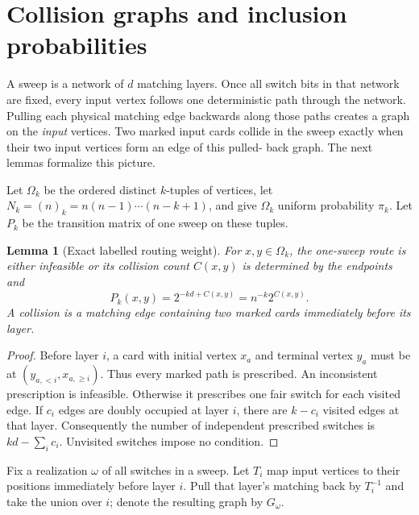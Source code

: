 \documentclass[11pt]{article}
\numberwithin{equation}{section}
\newtheorem{lemma}[theorem]{Lemma}
\theoremstyle{definition}\newtheorem{definition}[theorem]{Definition}
\theoremstyle{remark}\newtheorem{remark}[theorem]{Remark}
\begin{document}
\section{Collision graphs and inclusion probabilities}
\label{sec:graph}
A sweep is a network of $d$ matching layers.  Once all switch bits in that
network are fixed, every input vertex follows one deterministic path through
the network.  Pulling each physical matching edge backwards along those paths
creates a graph on the \emph{input} vertices.  Two marked input cards collide
in the sweep exactly when their two input vertices form an edge of this pulled-
back graph.  The next lemmas formalize this picture.

Let $\Omega_k$ be the ordered distinct $k$-tuples of vertices, let
$N_k=(n)_k=n(n-1)\cdots(n-k+1)$, and give $\Omega_k$ uniform probability
$\pi_k$. Let $P_k$ be the transition matrix of one sweep on these tuples.

\begin{lemma}[Exact labelled routing weight]\label{lem:routing}
For $x,y\in\Omega_k$, the one-sweep route is either infeasible or its
collision count $C(x,y)$ is determined by the endpoints and
\begin{equation}\label{eq:routing}
 P_k(x,y)=2^{-kd+C(x,y)}=n^{-k}2^{C(x,y)}.
\end{equation}
A collision is a matching edge containing two marked cards immediately
before its layer.
\end{lemma}
\begin{proof}
Before layer $i$, a card with initial vertex $x_a$ and terminal vertex $y_a$
must be at $(y_{a,<i},x_{a,\ge i})$. Thus every marked path is prescribed.
An inconsistent prescription is infeasible. Otherwise it prescribes one
fair switch for each visited edge. If $c_i$ edges are doubly occupied at
layer $i$, there are $k-c_i$ visited edges at that layer. Consequently the
number of independent prescribed switches is $kd-\sum_i c_i$. Unvisited
switches impose no condition.
\end{proof}

Fix a realization $\omega$ of all switches in a sweep. Let $T_i$ map input
vertices to their positions immediately before layer $i$. Pull that layer's
matching back by $T_i^{-1}$ and take the union over $i$; denote the resulting
graph by $G_\omega$.
\end{document}
